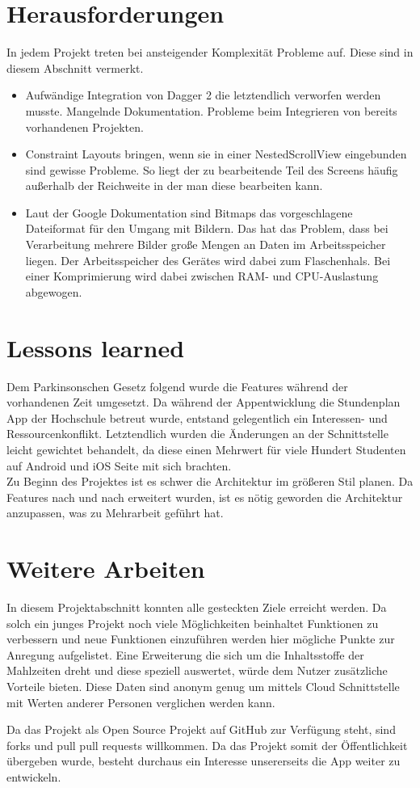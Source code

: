 \documentclass[
    DIV12,
    cleardouble=plain,
    headings=normal,
    pdftex,
    headexclude,footexclude,
    final
]{scrreprt}
\begin{document}
\chapter{Herausforderungen}
In jedem Projekt treten bei ansteigender Komplexität Probleme auf. Diese sind in diesem Abschnitt vermerkt.

\begin{itemize}
\item Aufwändige Integration von Dagger 2 die letztendlich verworfen werden musste. Mangelnde Dokumentation. Probleme beim Integrieren von bereits vorhandenen Projekten.
\item Constraint Layouts bringen, wenn sie in einer NestedScrollView eingebunden sind gewisse Probleme. So liegt der zu bearbeitende Teil des Screens häufig außerhalb der Reichweite in der man diese bearbeiten kann.
\item Laut der Google Dokumentation sind Bitmaps das vorgeschlagene Dateiformat für den Umgang mit Bildern. Das hat das Problem, dass bei Verarbeitung mehrere Bilder große Mengen an Daten im Arbeitsspeicher liegen. Der Arbeitsspeicher des Gerätes wird dabei zum Flaschenhals. Bei einer Komprimierung wird dabei zwischen RAM- und CPU-Auslastung abgewogen.

\end{itemize}

\newpage

\chapter{Lessons learned}
Dem Parkinsonschen Gesetz folgend wurde die Features während der vorhandenen Zeit umgesetzt. Da während der Appentwicklung die Stundenplan App der Hochschule betreut wurde, entstand gelegentlich ein Interessen- und Ressourcenkonflikt. Letztendlich wurden die Änderungen an der Schnittstelle leicht gewichtet behandelt, da diese einen Mehrwert für viele Hundert Studenten auf Android und iOS Seite mit sich brachten.\\
Zu Beginn des Projektes ist es schwer die Architektur im größeren Stil planen. Da Features nach und nach erweitert wurden, ist es nötig geworden die Architektur anzupassen, was zu Mehrarbeit geführt hat.

\newpage

\chapter{Weitere Arbeiten}
In diesem Projektabschnitt konnten alle gesteckten Ziele erreicht werden. Da solch ein junges Projekt noch viele Möglichkeiten beinhaltet Funktionen zu verbessern und neue Funktionen einzuführen werden hier mögliche Punkte zur Anregung aufgelistet. 
Eine Erweiterung die sich um die Inhaltsstoffe der Mahlzeiten dreht und diese speziell auswertet, würde dem Nutzer zusätzliche Vorteile bieten. Diese Daten sind anonym genug um mittels Cloud Schnittstelle mit Werten anderer Personen verglichen werden kann.

Da das Projekt als Open Source Projekt auf GitHub zur Verfügung steht, sind forks und pull pull requests willkommen. Da das Projekt somit der Öffentlichkeit übergeben wurde, besteht durchaus ein Interesse unsererseits die App weiter zu entwickeln.


\newpage


\listoffigures
\end{document}
